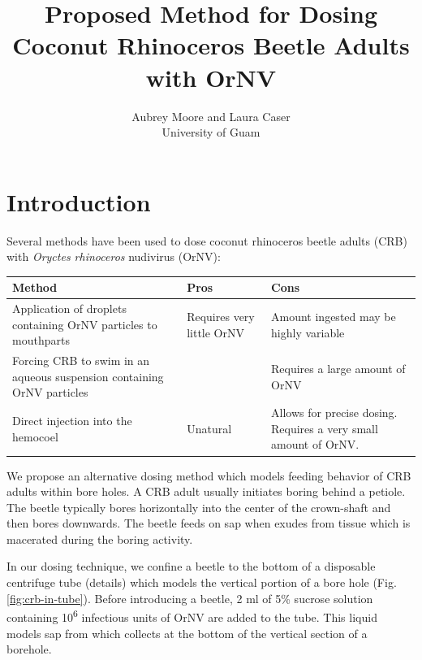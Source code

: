 \documentclass[12pt,letterpaper,english,bibliography=totocnumbered, abstract=on]{scrartcl}
\begin{document}
\titlehead{DRAFT}

\title{Proposed Method for Dosing Coconut Rhinoceros Beetle Adults with OrNV}

\author{Aubrey Moore and Laura Caser \\ University of Guam}


\maketitle

\pagebreak

\section{Introduction}

Several methods have been used to dose coconut rhinoceros beetle adults (CRB) with \textit{Oryctes rhinoceros} nudivirus (OrNV): 

\begin{table}[h]
	\centering
	\begin{tabular}{p{1.5in}p{1.5in}p{1.5in}}	
		\toprule
		Method & Pros & Cons \\
		\midrule	
		Application of droplets containing OrNV particles to mouthparts 
		& Requires very little OrNV 
		& Amount ingested may be highly variable \\
		\midrule
		Forcing CRB to swim in an aqueous suspension containing OrNV particles 
		&  
		& Requires a large amount of OrNV \\
		\midrule
		Direct injection into the hemocoel 
		& Unatural  
		& Allows for precise dosing. Requires a very small amount of OrNV. \\
		\bottomrule
	\end{tabular}
\end{table}

We propose an alternative dosing method which models feeding behavior of CRB adults within bore holes. A CRB adult usually initiates boring behind a petiole. The beetle typically bores horizontally into the center of the crown-shaft and then bores downwards. The beetle feeds on sap when exudes from tissue which is macerated during the boring activity.

In our dosing technique, we confine a beetle to the bottom of a disposable centrifuge tube (details) which models the vertical portion of a bore hole (Fig. \ref{fig:crb-in-tube}). Before introducing a beetle, 2 ml of 5\% sucrose solution containing 10\textsuperscript{6} infectious units of OrNV  are added to the tube. This liquid models sap from which collects at the bottom of the vertical section of a borehole.
\end{document}
